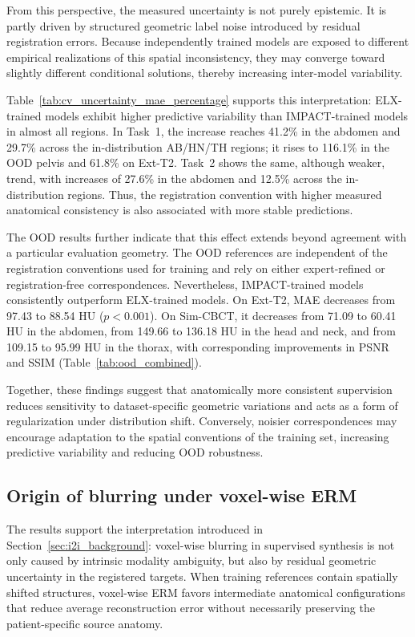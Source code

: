 \documentclass[lettersize,journal]{IEEEtran}
\begin{document}
From this perspective, the measured uncertainty is not purely epistemic. It is partly driven by structured geometric label noise introduced by residual registration errors. Because independently trained models are exposed to different empirical realizations of this spatial inconsistency, they may converge toward slightly different conditional solutions, thereby increasing inter-model variability. 

Table~\ref{tab:cv_uncertainty_mae_percentage} supports this interpretation: ELX-trained models exhibit higher predictive variability than IMPACT-trained models in almost all regions. In Task~1, the increase reaches 41.2\% in the abdomen and 29.7\% across the in-distribution AB/HN/TH regions; it rises to 116.1\% in the OOD pelvis and 61.8\% on Ext-T2. Task~2 shows the same, although weaker, trend, with increases of 27.6\% in the abdomen and 12.5\% across the in-distribution regions. Thus, the registration convention with higher measured anatomical consistency is also associated with more stable predictions.

The OOD results further indicate that this effect extends beyond agreement with a particular evaluation geometry. The OOD references are independent of the registration conventions used for training and rely on either expert-refined or registration-free correspondences. Nevertheless, IMPACT-trained models consistently outperform ELX-trained models. On Ext-T2, MAE decreases from 97.43 to 88.54 HU ($p<0.001$). On Sim-CBCT, it decreases from 71.09 to 60.41 HU in the abdomen, from 149.66 to 136.18 HU in the head and neck, and from 109.15 to 95.99 HU in the thorax, with corresponding improvements in PSNR and SSIM (Table~\ref{tab:ood_combined}).

Together, these findings suggest that anatomically more consistent supervision reduces sensitivity to dataset-specific geometric variations and acts as a form of regularization under distribution shift. Conversely,
noisier correspondences may encourage adaptation to the spatial conventions of the training set, increasing predictive variability and reducing OOD robustness.

\subsection{Origin of blurring under voxel-wise ERM}

The results support the interpretation introduced in Section~\ref{sec:i2i_background}: voxel-wise blurring in supervised synthesis is not only caused by intrinsic modality ambiguity, but also by residual geometric uncertainty in the registered targets. When training references contain spatially shifted structures, voxel-wise ERM favors intermediate anatomical configurations that reduce average reconstruction error without necessarily preserving the patient-specific source anatomy.
\end{document}
